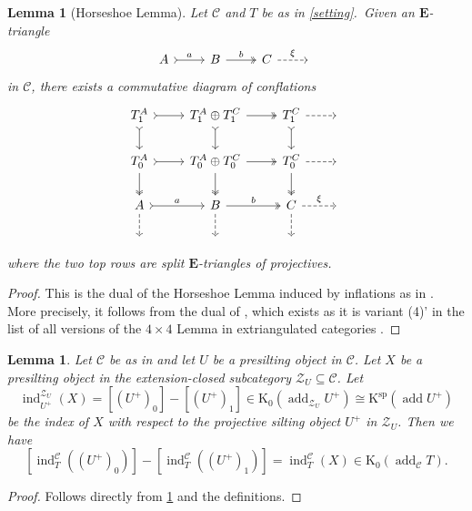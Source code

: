 \documentclass[10pt,twoside, a4paper,reqno]{amsart}
\DeclareMathOperator{\add}{add}
\DeclareMathOperator{\ind}{ind}
\newcommand{\calC}{\mathcal{C}}
\newcommand{\calZ}{\mathcal{Z}}
\newcommand{\E}{\mathbf{E}}
\newcommand{\K}{\mathrm{K}}
\newcommand{\Ksp}{\mathrm{K}^{\mathrm{sp}}}
\newtheorem{lemma}[theorem]{Lemma}
\theoremstyle{definition}
\begin{document}
\begin{lemma}[Horseshoe Lemma]\label{lem:horseshoe}
    {Let $\calC$ and $T$ be as in \cref{setting}.} Given an $\E$-triangle
    \begin{equation*}
    \begin{tikzcd}
        A \arrow[r,tail, "a"] & B \arrow[r,two heads, "b"] & C \arrow[r,dashed, "\xi"] & {}
    \end{tikzcd}
    \end{equation*}
    in $\calC$, there exists a commutative diagram of conflations
    \begin{equation*}
        \begin{tikzcd}
T^A_1 \arrow[d, tail] \arrow[r, tail]        & T^A_1 \oplus T^C_1 \arrow[d, tail] \arrow[r, two heads]     & T^C_1 \arrow[d, tail] \arrow[r, dashed]      & {} \\
T^A_0 \arrow[d, two heads] \arrow[r, tail]   & T^A_0\oplus T^C_0 \arrow[d, two heads] \arrow[r, two heads] & T^C_0 \arrow[d, two heads] \arrow[r, dashed] & {} \\
A \arrow[r, "a", tail] \arrow[d, dashed] & B \arrow[r, "b", two heads] \arrow[d, dashed]             & C \arrow[r, "\xi", dashed] \arrow[d, dashed] & {} \\
{}                                           & {}                                                          & {}                                           &   
\end{tikzcd}
    \end{equation*}
    where the two top rows are split $\E$-triangles of projectives.
\end{lemma}
\begin{proof}
	This is the dual of the Horseshoe Lemma induced by inflations as in \cite[Cor. 5.13]{ZLZ2026}. More precisely, it follows from the dual of \cite[Thm. 5.12]{ZLZ2026}, which exists as it is variant (4)' in the list of all versions of the $4 \times 4$ Lemma in extriangulated categories \cite[p. 41, Table of 4 × 4 Lemma and its variants]{ZLZ2026}. 
\end{proof}

\begin{lemma}\label{lem:compositeind}
	Let $\calC$ be as in  and let $U$ be a presilting object in $\calC$. Let $X$ be a presilting object in the extension-closed subcategory $\calZ_U \subseteq \calC$. Let 
	\[ \ind_{U^+}^{\calZ_U}(X) = [(U^+)_0] - [(U^+)_1] \in \K_0(\add_{\calZ_U} U^+) \cong \Ksp( \add U^+) \]
	be the index of $X$ with respect to the projective silting object $U^+$ in $\calZ_U$. Then we have
	\[ [ \ind_T^{\calC} ( (U^+)_0)] - [\ind_T^{\calC}((U^+)_1)] = \ind_T^{\calC} (X) \in \K_0(\add_{\calC} T).\]
\end{lemma}
\begin{proof}
	Follows directly from \cref{lem:horseshoe} and the definitions.
\end{proof}
\end{document}
